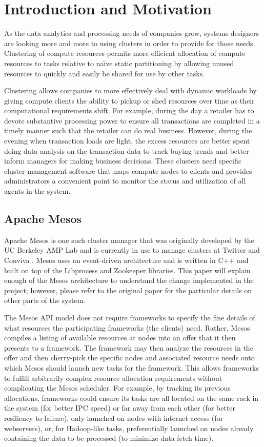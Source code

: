 \section{Introduction and Motivation}
\label{sec:intro}


As the data analytics and processing needs of companies grow, systems designers are looking
more and more to using clusters in order to provide for those needs. Clustering of compute
resources permits more efficient allocation of compute resources to tasks relative to
na\"{\i}ve static partitioning by allowing unused resources to quickly and easily be shared for
use by other tasks.

Clustering allows companies to more effectively deal with dynamic workloads by
giving compute clients the ability to pickup or shed resources over time as their computational
requirements shift. For example, during the day a retailer has to devote substantive processing
power to ensure all transactions are completed in a timely manner such that the retailer can do
real business. However, during the evening when transaction loads are light, the excess
resources are better spent doing data analysis on the transaction data to track buying trends
and better inform managers for making business decisions. These clusters need specific cluster
management software that maps compute nodes to clients and provides administrators a convenient
point to monitor the status and utilization of all agents in the system.

\subsection{Apache Mesos}
Apache Mesos is one such cluster manager that was originally developed by the UC Berkeley AMP
Lab and is currently in use to manage clusters at Twitter and Conviva \cite{mesos-paper,
mesos-website}. Mesos uses an event-driven architecture and is written in C++ and built on top
of the Libprocess and Zookeeper libraries. This paper will explain enough of the Mesos
architecture to understand the change implemented in the project; however, please refer to the
original paper \cite{mesos-paper} for the particular details on other parts of the system.

The Mesos API model does not require frameworks to specify the fine details of what resources
the participating frameworks (the clients) need.  Rather, Mesos compiles a listing of available
resources at nodes into an offer that it then presents to a framework. The framework may then
analyze the resources in the offer and then cherry-pick the specific nodes and associated
resource needs onto which Mesos should launch new tasks for the framework. This allows
frameworks to fulfill arbitrarily complex resource allocation requirements without complicating
the Mesos scheduler. For example, by tracking its previous allocations, frameworks could ensure
its tasks are all located on the same rack in the system (for better IPC speed) or far away
from each other (for better resiliency to failure), only launched on nodes with internet access
(for webservers), or, for Hadoop-like tasks, preferentially launched on nodes already
containing the data to be processed (to minimize data fetch time).

